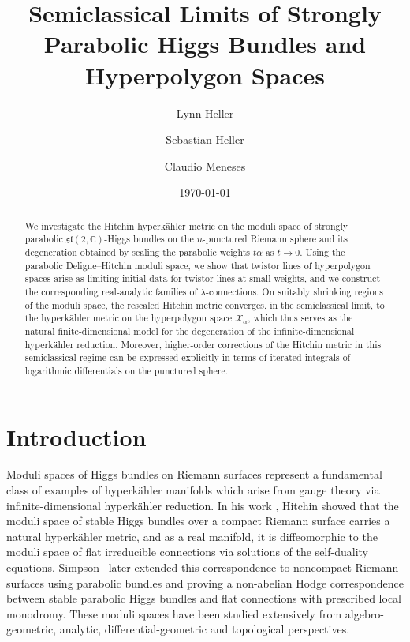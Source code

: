 \documentclass[12pt,a4paper]{amsart}
\title[Parabolic Higgs Bundles and Hyperpolygon Spaces]{Semiclassical Limits of Strongly Parabolic Higgs Bundles and Hyperpolygon Spaces}
\author[L. Heller]{Lynn Heller}
\author[S. Heller]{Sebastian Heller}
\author[C. Meneses]{Claudio Meneses}
\date{\today}
\theoremstyle{definition}
\theoremstyle{remark}
\newcommand{\C}{\mathbb C}
\begin{document}
\noindent
\begin{abstract}
We investigate the Hitchin hyperk\"ahler metric on the moduli space of strongly parabolic
$\mathfrak{sl}(2,\C)$-Higgs bundles on the $n$-punctured Riemann sphere and its
degeneration obtained by scaling the parabolic weights $t\alpha$ as $t\to0$.
Using the parabolic Deligne--Hitchin moduli space, we show that twistor lines of
hyperpolygon spaces arise as limiting initial data for twistor lines at small weights,
and we construct the corresponding real-analytic families of $\lambda$-connections.
On suitably shrinking regions of the moduli space, the rescaled Hitchin metric converges,
in the semiclassical limit, to the hyperk\"ahler metric on the hyperpolygon space
$\mathcal X_\alpha$, which thus serves as the natural finite-dimensional model for the
degeneration of the infinite-dimensional  hyperk\"ahler reduction.
Moreover, higher-order corrections of the Hitchin metric in this semiclassical regime
can be expressed explicitly in terms of iterated integrals of logarithmic differentials
on the punctured sphere.
\end{abstract}



\maketitle
\setcounter{tocdepth}{1}
\tableofcontents
\noindent


\section{Introduction}
Moduli spaces of Higgs bundles on Riemann surfaces represent a fundamental class of
examples of hyperk\"ahler manifolds which arise from gauge theory via infinite-dimensional
hyperk\"ahler reduction.
In his work \cite{Hitchin1987}, Hitchin showed that the moduli space of stable
Higgs bundles over a compact Riemann surface carries a natural hyperk\"ahler metric, and
as a real manifold, it is diffeomorphic to the moduli space of flat irreducible connections via
solutions of the self-duality equations.
Simpson~\cite{Sim2} later extended this correspondence to noncompact Riemann surfaces using
parabolic bundles and proving a non-abelian Hodge correspondence between stable
parabolic Higgs bundles and flat connections with prescribed local monodromy. These moduli spaces have been studied extensively from algebro-geometric, 
analytic, differential-geometric and topological perspectives.
\end{document}
